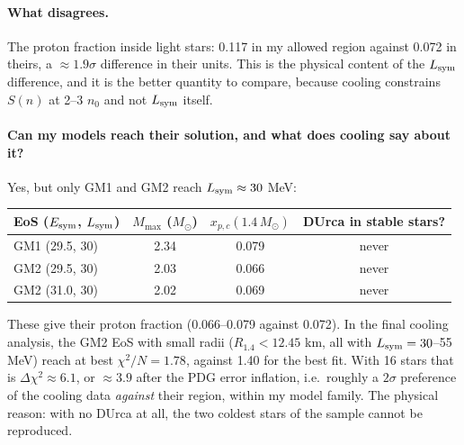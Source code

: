 \documentclass[11pt,a4paper]{article}
\newcommand{\Esym}{E_{\rm sym}}
\newcommand{\Lsym}{L_{\rm sym}}
\newcommand{\Msun}{M_\odot}
\begin{document}
\paragraph{What disagrees.} The proton fraction inside light stars: 0.117 in my allowed region against 0.072 in theirs, a $\approx1.9\sigma$ difference in their units. This is the physical content of the $\Lsym$ difference, and it is the better quantity to compare, because cooling constrains $S(n)$ at 2--3 $n_0$ and not $\Lsym$ itself.

\paragraph{Can my models reach their solution, and what does cooling say about it?} Yes, but only GM1 and GM2 reach $\Lsym\approx30$ MeV:
\begin{center}
\begin{tabular}{lccc}
\toprule
EoS ($\Esym$, $\Lsym$) & $M_{\max}$ ($\Msun$) & $x_{p,c}(1.4\,\Msun)$ & DUrca in stable stars?\\
\midrule
GM1 (29.5, 30) & 2.34 & 0.079 & never\\
GM2 (29.5, 30) & 2.03 & 0.066 & never\\
GM2 (31.0, 30) & 2.02 & 0.069 & never\\
\bottomrule
\end{tabular}
\end{center}
These give their proton fraction (0.066--0.079 against 0.072). In the final cooling analysis, the GM2 EoS with small radii ($R_{1.4}<12.45$ km, all with $\Lsym=30$--55 MeV) reach at best $\chi^2/N=1.78$, against 1.40 for the best fit. With 16 stars that is $\Delta\chi^2\approx6.1$, or $\approx3.9$ after the PDG error inflation, i.e.\ roughly a $2\sigma$ preference of the cooling data \emph{against} their region, within my model family. The physical reason: with no DUrca at all, the two coldest stars of the sample cannot be reproduced.
\end{document}
